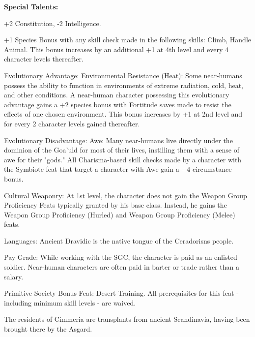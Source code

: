 \textbf{Special Talents:}
\begin{itemize*}
\item +2 Constitution, -2 Intelligence.
\item +1 Species Bonus with any skill check made in the following skills: Climb, Handle Animal. This bonus increases by an additional +1 at 4th level and every 4 character levels thereafter.
\item Evolutionary Advantage: Environmental Resistance (Heat): Some near-humans possess the ability to function in environments of extreme radiation, cold, heat, and other conditions. A near-human character possessing this evolutionary advantage gains a +2 species bonus with Fortitude saves made to resist the effects of one chosen environment. This bonus increases by +1 at 2nd level and for every 2 character levels gained thereafter.
\item Evolutionary Disadvantage: Awe: Many near-humans live directly under the dominion of the Goa'uld for most of their lives, instilling them with a sense of awe for their "gods." All Charisma-based skill checks made by a character with the Symbiote feat that target a character with Awe gain a +4 circumstance bonus.
\item Cultural Weaponry: At 1st level, the character does not gain the Weapon Group Proficiency Feats typically granted by his base class. Instead, he gains the Weapon Group Proficiency (Hurled) and Weapon Group Proficiency (Melee) feats.
\item Languages: Ancient Dravidic is the native tongue of the Ceradorisns people.
\item Pay Grade: While working with the SGC, the character is paid as an enlisted soldier. Near-human characters are often paid in barter or trade rather than a salary.
\item Primitive Society Bonus Feat: Desert Training. All prerequisites for this feat - including minimum skill levels - are waived.
\end{itemize*}

The residents of Cimmeria are transplants from ancient Scandinavia, having been brought there by the Asgard.

